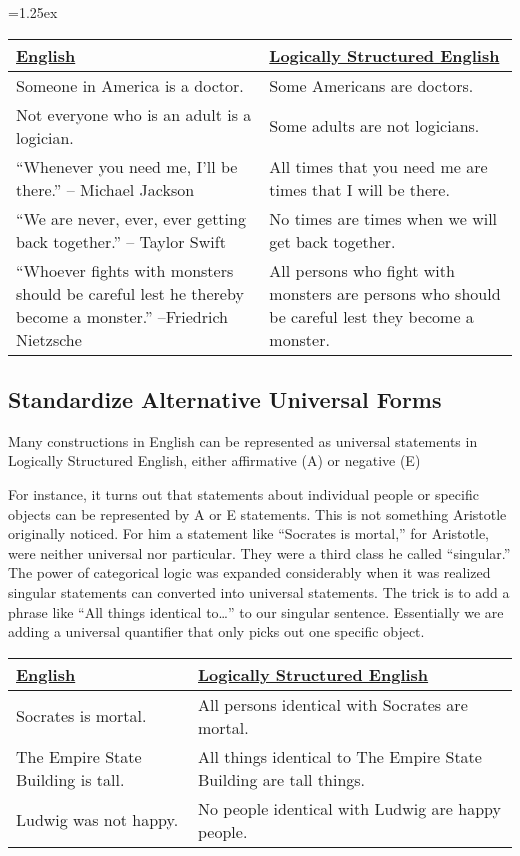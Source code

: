 \tabulinesep=1.25ex
\begin{longtabu}{p{.5\linewidth}p{.5\linewidth}}
\underline{English} &
\underline{Logically Structured English} \\
\endhead 
Someone in America is a doctor. &
Some Americans are doctors. \\

Not everyone who is an adult is a logician. &
Some adults are not logicians. \\

``Whenever you need me, I'll be there.'' -- Michael Jackson &
All times that you need me are times that I will be there. \\

``We are never, ever, ever getting back together.'' -- Taylor Swift &
No times are times when we will get back together.\\

``Whoever fights with monsters should be careful lest he thereby become a monster.'' --Friedrich Nietzsche & 
All persons who fight with monsters are persons who should be careful lest they become a monster.\\
 
\end{longtabu}

\subsection{Standardize Alternative Universal Forms}
\label{subsec:alternative_universals}

Many constructions in English can be represented as universal statements in Logically Structured English, either affirmative (A) or negative (E)

For instance, it turns out that statements about individual people or specific objects can be represented by A or E statements. This is not something Aristotle originally noticed. For him a statement like ``Socrates is mortal,'' for Aristotle, were neither universal nor particular. They were a third class he called ``singular.'' The power of categorical logic was expanded considerably when it was realized singular statements can converted into universal statements. The trick is to add a phrase like ``All things identical to\ldots'' to our singular sentence. Essentially we are adding a universal quantifier that only picks out one specific object.

\begin{longtabu}{p{.5\linewidth}p{.5\linewidth}}
\underline{English} &
\underline{Logically Structured English} \\
\endhead 
Socrates is mortal.&
All persons identical with Socrates are mortal. \\

The Empire State Building is tall. &
All things identical to The Empire State Building are tall things. \\

Ludwig was not happy. &
No people identical with Ludwig are happy people. \\

\end{longtabu}


